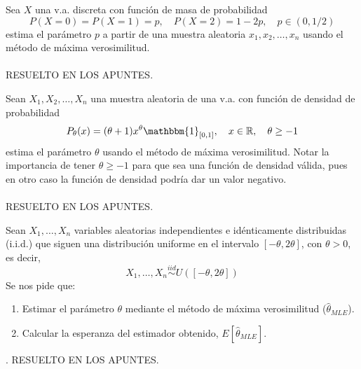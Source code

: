 \begin{ejercicio}
    Sea $X$ una v.a. discreta con función de masa de probabilidad 
    \begin{equation*}
        P(X=0)=P(X=1)=p, \quad P(X=2)=1-2p, \quad p \in (0,1/2)
    \end{equation*}
    estima el parámetro $p$ a partir de una muestra aleatoria $x_1, x_2, \ldots, x_n$ usando el método de máxima verosimilitud. \\ \\
    \noindent
    RESUELTO EN LOS APUNTES.
\end{ejercicio}

\begin{ejercicio}
    Sean $X_1, X_2, \ldots, X_n$ una muestra aleatoria de una v.a. con función de densidad de probabilidad
    \begin{equation*}
        P_{\theta}(x) = (\theta+1) x^{\theta}\mathbbm{1}_{[0,1]}, \quad x \in \R, \quad \theta \geq -1
    \end{equation*}
    estima el parámetro $\theta$ usando el método de máxima verosimilitud. Notar la importancia de tener $\theta \geq -1$ para que sea una función de densidad válida, pues en otro caso la función de densidad podría dar un valor  negativo. \\ \\

    \noindent
    RESUELTO EN LOS APUNTES.
\end{ejercicio}

\begin{ejercicio}
    Sean $X_1, \dots, X_n$ variables aleatorias independientes e idénticamente distribuidas (i.i.d.) que siguen una distribución uniforme en el intervalo $[-\theta, 2\theta]$, con $\theta > 0$, es decir,
    $$X_1, \dots, X_n \overset{iid}{\sim} U([-\theta, 2\theta])$$
    Se nos pide que:
    \begin{enumerate}[label=\arabic*)]
        \item Estimar el parámetro $\theta$ mediante el método de máxima verosimilitud ($\hat{\theta}_{MLE}$).
        \item Calcular la esperanza del estimador obtenido, $E[\hat{\theta}_{MLE}]$.
    \end{enumerate}.
    \noindent
    RESUELTO EN LOS APUNTES.
\end{ejercicio}

